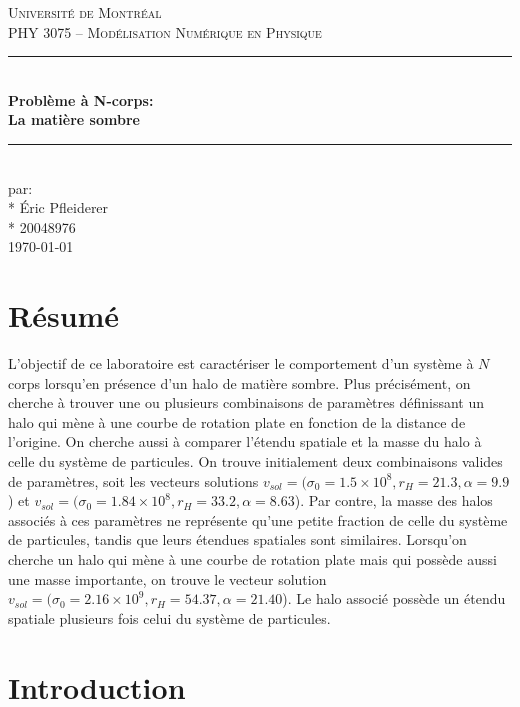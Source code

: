 \documentclass{article}
\begin{document}
	
\begin{titlepage}
	\centering
	\vspace*{1cm}
	\textsc{\LARGE Université de Montréal}\\[1cm] 
	\textsc{\Large PHY 3075 -- Modélisation Numérique en Physique}\\[3cm]
	\vspace{1cm}
	\rule{\linewidth}{0.5mm} \\[0.5cm]
	{\LARGE \bfseries Problème à N-corps: \\ La matière sombre} \\[0.2cm]
	\rule{\linewidth}{0.5mm} \\[3cm]
	\vspace{1cm}
	\large par: \\*
	Éric Pfleiderer \\* 
	20048976\\[3cm] 
	\vspace{1cm}
	{\large \today}\\[3cm]
	\vfill
\end{titlepage}

\section*{Résumé}\label{sec:resume}

L'objectif de ce laboratoire est caractériser le comportement d'un système à $N$ corps lorsqu'en présence d'un halo de matière sombre. Plus précisément, on cherche à trouver une ou plusieurs combinaisons de paramètres définissant un halo qui mène à une courbe de rotation plate en fonction de la distance de l'origine. On cherche aussi à comparer l'étendu spatiale et la masse du halo à celle du système de particules. On trouve initialement deux combinaisons valides de paramètres, soit les vecteurs solutions $v_{sol}=(\sigma_0=1.5\times 10^8, r_H=21.3, \alpha=9.9$) et $v_{sol}=(\sigma_0=1.84\times 10^8, r_H=33.2, \alpha=8.63$). Par contre, la masse des halos associés à ces paramètres ne représente qu'une petite fraction de celle du système de particules, tandis que leurs étendues spatiales sont similaires. Lorsqu'on cherche un halo qui mène à une courbe de rotation plate mais qui possède aussi une masse importante, on trouve le vecteur solution $v_{sol}=(\sigma_0=2.16\times 10^9, r_H=54.37, \alpha=21.40$). Le halo associé possède un étendu spatiale plusieurs fois celui du système de particules.

\section{Introduction}\label{sec:introduction}
\end{document}
